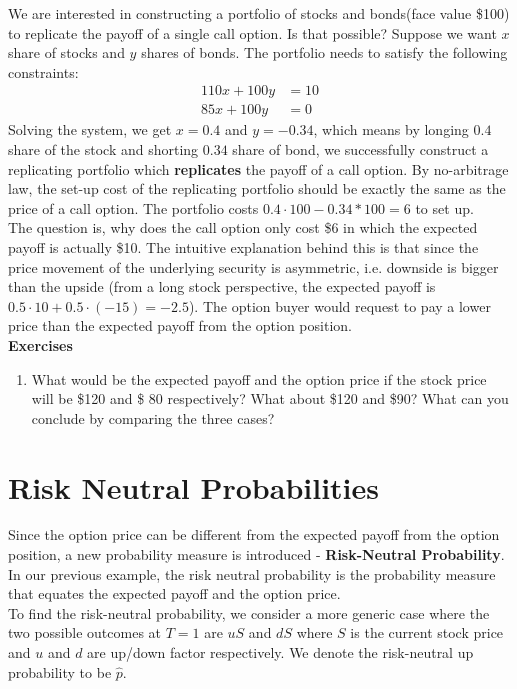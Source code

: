 \documentclass{article}
\begin{document}
We are interested in constructing a portfolio of stocks and bonds(face value \$100) to replicate the payoff of a single call option. Is that possible? Suppose we want $x$ share of stocks and $y$ shares of bonds. The portfolio needs to satisfy the following constraints:
\begin{align*} 
110x + 100y &=  10 \\ 
85x + 100y &=  0
\end{align*}
Solving the system, we get $x = 0.4$ and $y = -0.34$, which means by longing $0.4$ share of the stock and shorting $0.34$ share of bond, we successfully construct a replicating portfolio which \textbf{replicates} the payoff of a call option. By no-arbitrage law, the set-up cost of the replicating portfolio should be exactly the same as the price of a call option. The portfolio costs $0.4\cdot 100 - 0.34*100 = 6$ to set up.\\

The question is, why does the call option only cost \$6 in which the expected payoff is actually \$10. The intuitive explanation behind this is that since the price movement of the underlying security is asymmetric, i.e. downside is bigger than the upside (from a long stock perspective, the expected payoff is $0.5\cdot 10 + 0.5\cdot (-15) = -2.5$). The option buyer would request to pay a lower price than the expected payoff from the option position.\\

\textbf{Exercises}
\begin{enumerate}
    \item What would be the expected payoff and the option price if the stock price will be \$120 and \$ 80 respectively? What about \$120 and \$90? What can you conclude by comparing the three cases?
\end{enumerate}

\section{Risk Neutral Probabilities}
Since the option price can be different from the expected payoff from the option position, a new probability measure is introduced - \textbf{Risk-Neutral Probability}. In our previous example, the risk neutral probability is the probability measure that equates the expected payoff and the option price.\\

To find the risk-neutral probability, we consider a more generic case where the two possible outcomes at $T=1$ are $uS$ and $dS$ where $S$ is the current stock price and $u$ and $d$ are up/down factor respectively. We denote the risk-neutral up probability to be $\hat{p}$.\\
\end{document}
